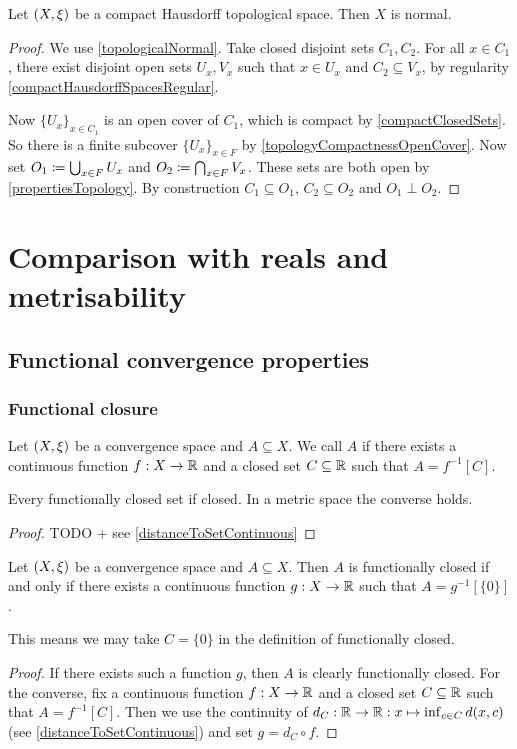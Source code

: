 \begin{proposition} \label{compactHausdorffSpacesNormal}
Let $\sSet{X,\xi}$ be a compact Hausdorff topological space. Then $X$ is normal.
\end{proposition}
\begin{proof}
We use \ref{topologicalNormal}. Take closed disjoint sets $C_1,C_2$. For all $x\in C_1$, there exist disjoint open sets $U_x, V_x$ such that $x\in U_x$ and $C_2\subseteq V_x$, by regularity \ref{compactHausdorffSpacesRegular}.

Now $\{U_x\}_{x\in C_1}$ is an open cover of $C_1$, which is compact by \ref{compactClosedSets}. So there is a finite subcover $\{U_x\}_{x\in F}$ by \ref{topologyCompactnessOpenCover}. Now set $O_1 \coloneqq \bigcup_{x\in F} U_x$ and $O_2 \coloneqq \bigcap_{x\in F} V_x$. These sets are both open by \ref{propertiesTopology}. By construction $C_1\subseteq O_1$, $C_2\subseteq O_2$ and $O_1\perp O_2$.
\end{proof}

\section{Comparison with reals and metrisability}
\subsection{Functional convergence properties}
\subsubsection{Functional closure}
\begin{definition}
Let $\sSet{X,\xi}$ be a convergence space and $A\subseteq X$. We call $A$  if there exists a continuous function $f: X\to \mathbb{R}$ and a closed set $C\subseteq \mathbb{R}$ such that $A = f^{-1}[C]$.
\end{definition}

\begin{proposition}
Every functionally closed set if closed. In a metric space the converse holds.
\end{proposition}
\begin{proof}
TODO + see \ref{distanceToSetContinuous}
\end{proof}

\begin{lemma} \label{functionallyClosedZeroSet}
Let $\sSet{X,\xi}$ be a convergence space and $A\subseteq X$. Then $A$ is functionally closed \textup{if and only if} there exists a continuous function $g: X\to \mathbb{R}$ such that $A = g^{-1}[\{0\}]$.
\end{lemma}
This means we may take $C = \{0\}$ in the definition of functionally closed.
\begin{proof}
If there exists such a function $g$, then $A$ is clearly functionally closed. For the converse, fix a continuous function $f: X\to \mathbb{R}$ and a closed set $C\subseteq \mathbb{R}$ such that $A = f^{-1}[C]$. Then we use the continuity of $d_C: \mathbb{R}\to\mathbb{R}: x\mapsto \inf_{c\in C}d(x,c)$ (see \ref{distanceToSetContinuous}) and set $g = d_C\circ f$.
\end{proof}

